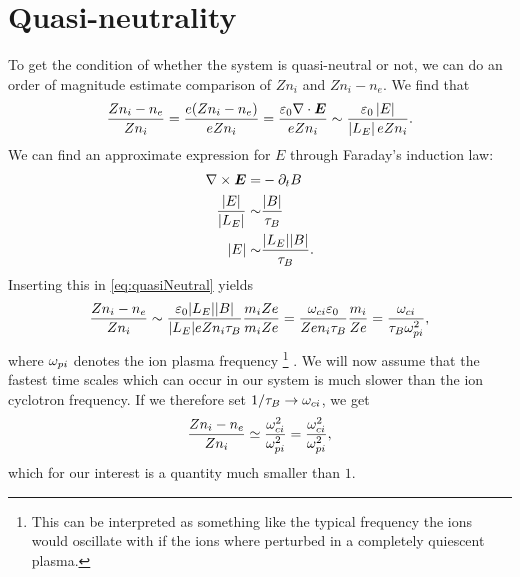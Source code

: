 \section{Quasi-neutrality}
\label{sec:qn}
To get the condition of whether the system is quasi-neutral or not, we can do an order of magnitude estimate comparison of $Zn_i$ and $Zn_i - n_e$.
We find that
%
\begin{align}
    \frac{Zn_i - n_e}{Zn_i} =
    \frac{e(Zn_i - n_e)}{eZn_i}
    =
    \frac{\varepsilon_0\nabla\cdot\boldsymbol{E}}{eZn_i}
    \sim
    \frac{\varepsilon_0\left|E\right|}{\left|L_E\right|eZn_i}.
    \label{eq:quasiNeutral}
\end{align}
%
We can find an approximate expression for $E$ through Faraday's induction law:
%
\begin{align*}
    \nabla\times\boldsymbol{E} =& -\partial_t B\\
    \frac{|E|}{|L_E|} \sim& \frac{|B|}{\tau_B}\\
    |E| \sim& \frac{|L_E||B|}{\tau_B}.
\end{align*}
%
Inserting this in \cref{eq:quasiNeutral} yields
%
\begin{align*}
    \frac{Zn_i - n_e}{Zn_i}
    \sim
    \frac{\varepsilon_0 |L_E||B|}{|L_E| e Zn_i \tau_B}\frac{m_i Ze}{m_i Ze}
    =
    \frac{\omega_{ci}\varepsilon_0}{Z e n_i\tau_B}\frac{m_i}{Z e}
    =
    \frac{\omega_{ci}}{\tau_B\omega_{pi}^2},
\end{align*}
%
where $\omega_{pi}$ denotes the ion plasma frequency%
\footnote{This can be interpreted as something like the typical frequency the ions would oscillate with if the ions where perturbed in a completely quiescent plasma.}
%
.
We will now assume that the fastest time scales which can occur in our system is much slower than the ion cyclotron frequency.
If we therefore set $1/\tau_B\to\omega_{ci}$, we get
%
\begin{align}
    \frac{Zn_i - n_e}{Zn_i}
    \simeq
    \frac{\omega_{ci}^2}{\omega_{pi}^2}
    =
    \frac{\omega_{ci}^2}{\omega_{pi}^2},
    \label{eq:quasiNCompare}
\end{align}
%
which for our interest is a quantity much smaller than $1$.

